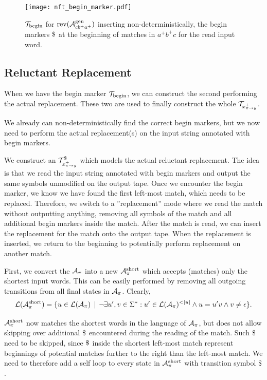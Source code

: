 \begin{figure}[ht]%
  \centering
  \texttt{[image: nft\_begin\_marker.pdf]}
  \caption{\nft $\mathcal{T}_{\text{begin}}$ for $\text{rev(}\mathcal{A}^{\text{gen}}_{cb^+a^+}\text{)}$ inserting non-deterministically, the begin markers $\marker$ at the beginning of matches in $a^+b^+c$ for the read input word.}
  \label{fig:begin_marker_nft}
\end{figure}

\subsection{Reluctant Replacement \nft}
\label{sec:reluctant_replacement_nft}

When we have the begin marker \nft $\mathcal{T}_{\text{begin}}$, we can construct the second \nft performing the actual replacement.
These two \nfts are used to finally construct the whole $\mathcal{T}_{x^{+}_{\pi \rightarrow y}}$.

We already can non-deterministically find the correct begin markers, but we now need to perform the actual replacement(s) on the input string annotated with begin markers.

We construct an \nft $\mathcal{T}^\$_{x^{+}_{\pi \rightarrow y}}$ which models the actual reluctant replacement.
The idea is that we read the input string annotated with begin markers and output the same symbols unmodified on the output tape.
Once we encounter the begin marker, we know we have found the first left-most match, which needs to be replaced.
Therefore, we switch to a ''replacement'' mode where we read the match without outputting anything, removing all symbols of the match and all additional begin markers inside the match.
After the match is read, we can insert the replacement for the match onto the output tape.
When the replacement is inserted, we return to the beginning to potentially perform replacement on another match.

First, we convert the $\mathcal{A}_{\pi}$ into a new \nfa $\mathcal{A}^{\text{short}}_{\pi}$ which accepts (matches) only the shortest input words.
This can be easily performed by removing all outgoing transitions from all final states in $\mathcal{A}_{\pi}$.
Clearly,
$$\langof{\aut^{\text{short}}_{\pi}} = \{ u \in \langof{\aut_{\pi}} \,\mid\, \neg \exists u', v \in \Sigma^*: u' \in \langof{\aut_{\pi}}^{<|u|} \land u = u'v \land v \neq \epsilon \}\text{.}$$

$\mathcal{A}^{\text{short}}_{\pi}$ now matches the shortest words in the language of $\mathcal{A}_{\pi}$, but does not allow skipping over additional $\marker$ encountered during the reading of the match.
Such $\marker$ need to be skipped, since $\marker$ inside the shortest left-most match represent beginnings of potential matches further to the right than the left-most match.
We need to therefore add a self loop to every state in $\mathcal{A}^{\text{short}}_{\pi}$ with transition symbol $\marker$.

